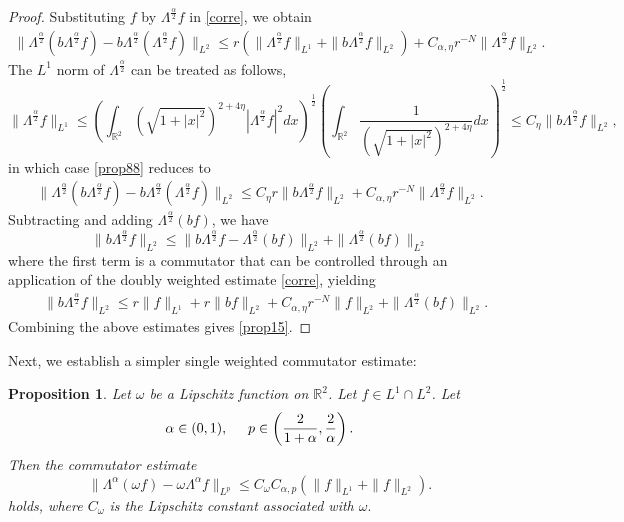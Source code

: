 \documentclass[12pt,reqno]{amsart}
\newcommand{\be}{\begin{equation}}
\newcommand{\ee}{\end{equation}}
\newtheorem{prop}[thm]{Proposition}
\newcommand{\R}{\mathbb R}
\begin{document}
\begin{proof}
Substituting $f$ by $\Lambda^{\frac{\alpha}{2}}f$ in \eqref{corre}, we obtain 
\be \label{prop88}
\begin{aligned}
\|\Lambda^{\frac{\alpha}{2}}\left(b \Lambda^{\frac{\alpha}{2}}f\right)  - b\Lambda^{\frac{\alpha}{2}} (\Lambda^{\frac{\alpha}{2}} f)\|_{L^2}
\le
r \left(\|\Lambda^{\frac{\alpha}{2}}f\|_{L^1} + \|b \Lambda^{\frac{\alpha}{2}}f\|_{L^2} \right)
+ C_{\alpha,  \eta} r^{-N} \|\Lambda^{\frac{\alpha}{2}}f \|_{L^2}.
\end{aligned}
\ee The $L^1$ norm of $\Lambda^{\frac{\alpha}{2}}$ can be treated as follows,
\be 
\|\Lambda^{\frac{\alpha}{2}}f\|_{L^1} 
\le \left(\int_{\R^2} \left(\sqrt{1+|x|^2} \right)^{2+ 4\eta }|\Lambda^{\frac{\alpha}{2}}f|^2 dx  \right)^{\frac{1}{2}} \left(\int_{\R^2} \frac{1}{\left(\sqrt{1+|x|^2} \right)^{2+ 4\eta }} dx \right)^{\frac{1}{2}} \le C_{\eta} \|b\Lambda^{\frac{\alpha}{2}}f\|_{L^2},
\ee in which case \eqref{prop88} reduces to 
\be \label{prop77}
\begin{aligned}
\|\Lambda^{\frac{\alpha}{2}}\left(b \Lambda^{\frac{\alpha}{2}}f\right)  - b\Lambda^{\frac{\alpha}{2}} (\Lambda^{\frac{\alpha}{2}} f)\|_{L^2}
\le
C_{\eta} r \|b \Lambda^{\frac{\alpha}{2}}f\|_{L^2} 
+ C_{\alpha,  \eta} r^{-N} \|\Lambda^{\frac{\alpha}{2}}f \|_{L^2}.
\end{aligned}
\ee 
Subtracting and adding $\Lambda^{\frac{\alpha}{2}} (b f)$, we have
\be 
\|b\Lambda^{\frac{\alpha}{2}}f\|_{L^2}
\le \|b\Lambda^{\frac{\alpha}{2}}f - \Lambda^{\frac{\alpha}{2}}(bf) \|_{L^2} + \|\Lambda^{\frac{\alpha}{2}}(bf)\|_{L^2}
\ee 
 where the first term is a commutator that can be controlled through an application of the doubly weighted estimate \eqref{corre}, yielding
\be \label{prop99}
\begin{aligned}
&\|b \Lambda^{\frac{\alpha}{2}} f\|_{L^2} \le  r\|f\|_{L^1} + r\|bf\|_{L^2} + C_{\alpha,\eta}r^{-N}\|f\|_{L^2} + \|\Lambda^{\frac{\alpha}{2}}(bf)\|_{L^2}.
\end{aligned}
\ee  Combining the above estimates gives \eqref{prop15}. 
\end{proof}

Next, we establish a simpler  single weighted commutator estimate:

\begin{prop} \label{commutator-estimate-1}
Let $\omega$ be a Lipschitz function on $\R^2$. Let $f \in L^1 \cap L^2$. Let 
\be 
\alpha \in (0,1), \hspace{0.5cm} p \in \left(\frac{2}{1+\alpha}, \frac{2}{\alpha}\right).
\ee Then the commutator estimate
\be \label{propp}
\|\Lambda^{\alpha}(\omega f) - \omega \Lambda^{\alpha}f\|_{L^p}
\le C_{\omega}C_{\alpha, p} (\|f\|_{L^1} + \|f\|_{L^2}). 
\ee holds, where $C_{\omega}$ is the Lipschitz constant associated with $\omega.$
\end{prop}
\end{document}
